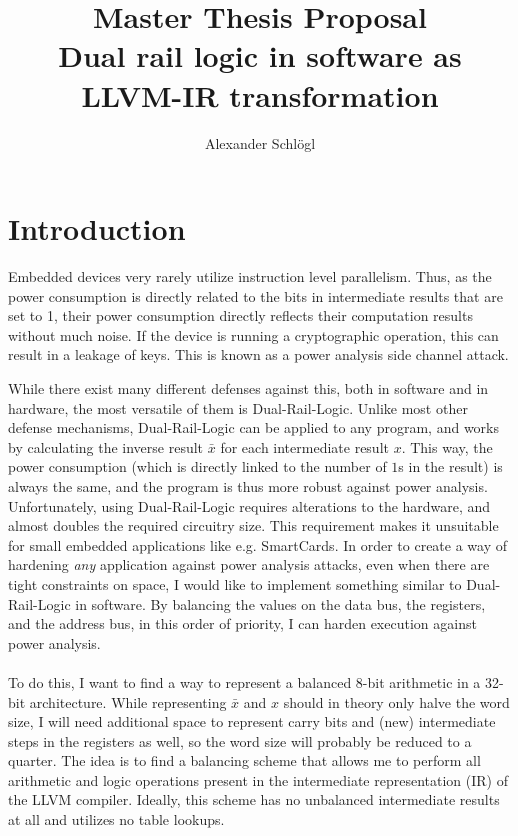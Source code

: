 \documentclass{article}
\title{%
  Master Thesis Proposal\\
  \large Dual rail logic in software as LLVM-IR transformation}
\author{Alexander Schl\"ogl}
\newcommand{\dual}{Dual-Rail-Logic}
\newcommand{\llvm}{LLVM}
\begin{document}
\maketitle

\section{Introduction}
Embedded devices very rarely utilize instruction level parallelism.
Thus, as the power consumption is directly related to the bits in intermediate results that are set to 1, their power consumption directly reflects their computation results without much noise.
If the device is running a cryptographic operation, this can result in a leakage of keys.
This is known as a power analysis side channel attack\cite{kocher1999differential}.

While there exist many different defenses against this, both in software and in hardware, the most versatile of them is \dual{}\cite{sokolov2005design}.
Unlike most other defense mechanisms, \dual{} can be applied to any program, and works by calculating the inverse result $\bar{x}$ for each intermediate result $x$.
This way, the power consumption (which is directly linked to the number of $1$s in the result) is always the same, and the program is thus more robust against power analysis.
Unfortunately, using \dual{} requires alterations to the hardware, and almost doubles the required circuitry size.
This requirement makes it unsuitable for small embedded applications like e.g. SmartCards.
In order to create a way of hardening \emph{any} application against power analysis attacks, even when there are tight constraints on space, I would like to implement something similar to \dual{} in software.
By balancing the values on the data bus, the registers, and the address bus, in this order of priority, I can harden execution against power analysis.
\\
\\
To do this, I want to find a way to represent a balanced 8-bit arithmetic in a 32-bit architecture.
While representing $\bar{x}$ and $x$ should in theory only halve the word size, I will need additional space to represent carry bits and (new) intermediate steps in the registers as well, so the word size will probably be reduced to a quarter.
The idea is to find a balancing scheme that allows me to perform all arithmetic and logic operations present in the intermediate representation (IR) of the \llvm{} compiler.
Ideally, this scheme has no unbalanced intermediate results at all and utilizes no table lookups.
\end{document}
